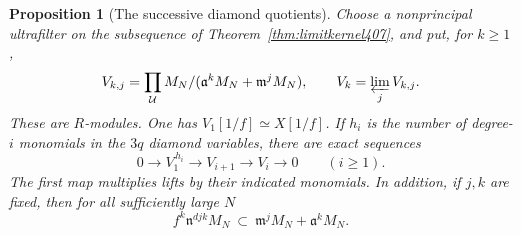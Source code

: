 \documentclass[a4paper,11pt]{article}
\newtheorem{proposition}{Proposition}[section]
\theoremstyle{definition}
\theoremstyle{remark}
\numberwithin{equation}{section}
\begin{document}
\begin{proposition}[The successive diamond quotients]\leavevmode
\label{prop:partialpatch408}
Choose a nonprincipal ultrafilter on the subsequence of
Theorem~\ref{thm:limitkernel407}, and put, for \(k\ge1\),
\[
 V_{k,j}=\prod_{\mathcal U}
          M_N/(\mathfrak a^k M_N+\mathfrak m^j M_N),\qquad
 V_k=\varprojlim_j V_{k,j}.
\]
These are \(R\)-modules. One has \(V_1[1/f]\simeq X[1/f]\).
If \(h_i\) is the number of degree-\(i\) monomials in the
\(3q\) diamond variables, there are exact sequences
\[
             0\longrightarrow V_1^{\,h_i}
                \longrightarrow V_{i+1}\longrightarrow V_i
                \longrightarrow0\qquad (i\ge1).
\]
The first map multiplies lifts by their indicated monomials.
In addition, if \(j,k\) are fixed, then for all sufficiently
large \(N\)
\[
      f^k\mathfrak n^{djk}M_N
                \ \subset\ \mathfrak m^j M_N+\mathfrak a^k M_N .
\]
\end{proposition}
\end{document}
